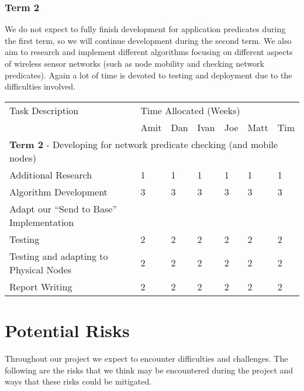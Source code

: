\documentclass[a4paper]{article}
\begin{document}
\subsubsection{Term 2}

We do not expect to fully finish development for application predicates during
the first term, so we will continue development during the second term. We also
aim to research and implement different algorithms focusing on different aspects
of wireless sensor networks (such as node mobility and checking network
predicates). Again a lot of time is devoted to testing and deployment due to the
difficulties involved.

\begin{table}[H]
	\centering
	\begin{tabular}{| l | l | l | l | l | l | l |}
	Task Description & \multicolumn{6}{|l|}{Time Allocated (Weeks)}\\
	~ & Amit & Dan & Ivan & Joe & Matt & Tim \\
	\hline
	\hline
	\multicolumn{7}{|l|}{\textbf{Term 2} - Developing for network predicate
checking (and mobile nodes)} \\
	\hline
	
	Additional Research & 1 & 1 & 1 & 1 & 1 & 1\\
	Algorithm Development & 3 & 3 & 3 & 3 & 3 & 3\\
	Adapt our ``Send to Base'' Implementation & ~ & ~ & ~ & ~ & ~ & ~\\
	Testing & 2 & 2 & 2 & 2 & 2 & 2\\
	Testing and adapting to Physical Nodes & 2 & 2 & 2 & 2 & 2 & 2\\
	Report Writing & 2 & 2 & 2 & 2 & 2 & 2\\
	
	\hline
	
	\end{tabular}
\end{table}


\section{Potential Risks}

Throughout our project we expect to encounter difficulties and challenges. The
following are the risks that we think may be encountered during the project and
ways that these risks could be mitigated.
\end{document}
